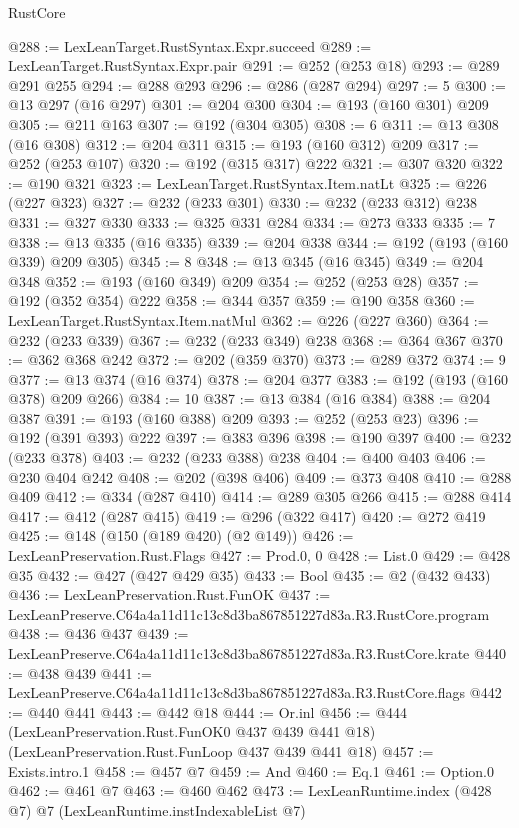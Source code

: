 \begin{lexlean}{RustCore}
\begin{coremodule}
@288 := LexLeanTarget.RustSyntax.Expr.succeed
@289 := LexLeanTarget.RustSyntax.Expr.pair
@291 := @252 (@253 @18)
@293 := @289 @291 @255
@294 := @288 @293
@296 := @286 (@287 @294)
@297 := 5
@300 := @13 @297 (@16 @297)
@301 := @204 @300
@304 := @193 (@160 @301) @209
@305 := @211 @163
@307 := @192 (@304 @305)
@308 := 6
@311 := @13 @308 (@16 @308)
@312 := @204 @311
@315 := @193 (@160 @312) @209
@317 := @252 (@253 @107)
@320 := @192 (@315 @317) @222
@321 := @307 @320
@322 := @190 @321
@323 := LexLeanTarget.RustSyntax.Item.natLt
@325 := @226 (@227 @323)
@327 := @232 (@233 @301)
@330 := @232 (@233 @312) @238
@331 := @327 @330
@333 := @325 @331 @284
@334 := @273 @333
@335 := 7
@338 := @13 @335 (@16 @335)
@339 := @204 @338
@344 := @192 (@193 (@160 @339) @209 @305)
@345 := 8
@348 := @13 @345 (@16 @345)
@349 := @204 @348
@352 := @193 (@160 @349) @209
@354 := @252 (@253 @28)
@357 := @192 (@352 @354) @222
@358 := @344 @357
@359 := @190 @358
@360 := LexLeanTarget.RustSyntax.Item.natMul
@362 := @226 (@227 @360)
@364 := @232 (@233 @339)
@367 := @232 (@233 @349) @238
@368 := @364 @367
@370 := @362 @368 @242
@372 := @202 (@359 @370)
@373 := @289 @372
@374 := 9
@377 := @13 @374 (@16 @374)
@378 := @204 @377
@383 := @192 (@193 (@160 @378) @209 @266)
@384 := 10
@387 := @13 @384 (@16 @384)
@388 := @204 @387
@391 := @193 (@160 @388) @209
@393 := @252 (@253 @23)
@396 := @192 (@391 @393) @222
@397 := @383 @396
@398 := @190 @397
@400 := @232 (@233 @378)
@403 := @232 (@233 @388) @238
@404 := @400 @403
@406 := @230 @404 @242
@408 := @202 (@398 @406)
@409 := @373 @408
@410 := @288 @409
@412 := @334 (@287 @410)
@414 := @289 @305 @266
@415 := @288 @414
@417 := @412 (@287 @415)
@419 := @296 (@322 @417)
@420 := @272 @419
@425 := @148 (@150 (@189 @420) (@2 @149))
@426 := LexLeanPreservation.Rust.Flags
@427 := Prod.{0, 0}
@428 := List.{0}
@429 := @428 @35
@432 := @427 (@427 @429 @35)
@433 := Bool
@435 := @2 (@432 @433)
@436 := LexLeanPreservation.Rust.FunOK
@437 := LexLeanPreserve.C64a4a11d11c13c8d3ba867851227d83a.R3.RustCore.program
@438 := @436 @437
@439 := LexLeanPreserve.C64a4a11d11c13c8d3ba867851227d83a.R3.RustCore.krate
@440 := @438 @439
@441 := LexLeanPreserve.C64a4a11d11c13c8d3ba867851227d83a.R3.RustCore.flags
@442 := @440 @441
@443 := @442 @18
@444 := Or.inl
@456 := @444
    (LexLeanPreservation.Rust.FunOK0 @437 @439 @441 @18)
    (LexLeanPreservation.Rust.FunLoop @437 @439 @441 @18)
@457 := Exists.intro.{1}
@458 := @457 @7
@459 := And
@460 := Eq.{1}
@461 := Option.{0}
@462 := @461 @7
@463 := @460 @462
@473 := LexLeanRuntime.index
    (@428 @7)
    @7
    (LexLeanRuntime.instIndexableList @7)

\end{coremodule}
\end{lexlean}

